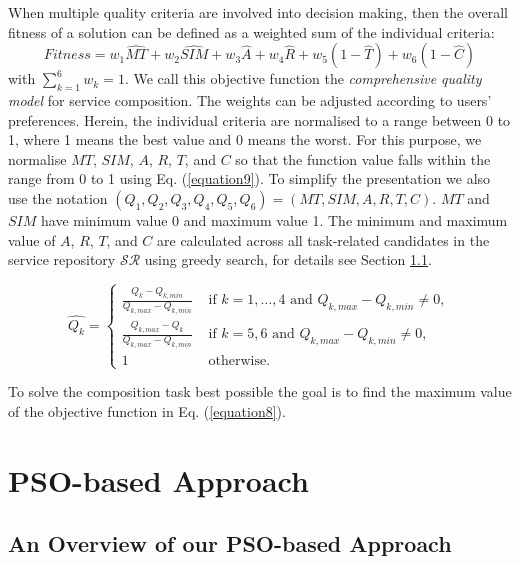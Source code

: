 \noindent When multiple quality criteria are involved into decision making, then the overall fitness of a solution can be defined as a weighted sum of the individual criteria: 
\begin{equation}
\label{equation8}
Fitness = w_1 \hat{MT} + w_2 \hat{SIM} + w_3 \hat{A} + w_4 \hat{R} + w_5(1 - \hat{T}) + w_6(1 - \hat{C})
\end{equation}
\noindent with $\sum_{k=1}^{6} w_k= 1$. We call this objective function the \emph{comprehensive quality model} for service composition.
The weights can be adjusted according to users' preferences. Herein, the individual criteria are normalised to a range between 0 to 1, where 1 means the best value and 0 means the worst. For this purpose, we normalise $MT$, $SIM$, $A$, $R$, $T$, and $C$ so that the function value falls within the range from 0 to 1 using Eq. (\ref{equation9}). To simplify the presentation we also use the notation $(Q_1,Q_2,Q_3,Q_4,Q_5,Q_6) = (MT,SIM,A,R,T,C)$. $MT$ and $SIM$ have minimum value 0 and maximum value 1. The minimum and maximum value of $A$, $R$, $T$, and $C$ are calculated across all task-related candidates in the service repository $\mathcal{SR}$ using greedy search, for details see Section \ref{PSO_based_approach}.

\begin{equation}
\label{equation9}
\hat{Q_k} = 
\begin{cases}
	\frac{Q_k - Q_{k, min}}{Q_{k, max} - Q_{k, min}} & \text{ if $k=1,\ldots,4$ and }Q_{k, max} - Q_{k, min} \neq 0,\\
	\frac{Q_{k,max} - Q_k}{Q_{k, max} - Q_{k, min}} & \text{ if $k=5,6$ and }Q_{k, max} - Q_{k, min} \neq 0,\\
	1 & \text{ otherwise}.
\end{cases}
\end{equation}

\noindent To solve the composition task best possible the goal is to find the maximum value of the objective function in Eq. (\ref{equation8}).


\section{PSO-based Approach}\label{qswsc_approach}
\subsection{An Overview of our PSO-based Approach}\label{PSO_based_approach}

